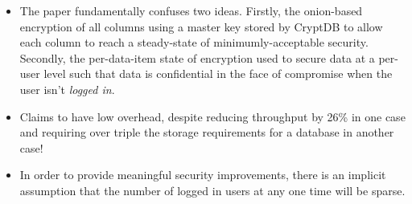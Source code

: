 \documentclass[11pt]{article}
\begin{document}
\begin{itemize}

    \item The paper fundamentally confuses two ideas. Firstly, the onion-based
    encryption of all columns using a master key stored by CryptDB to allow
    each column to reach a steady-state of minimumly-acceptable security.
    Secondly, the per-data-item state of encryption used to secure data at a
    per-user level such that data is confidential in the face of compromise
    when the user isn't \textit{logged in}.

    \item Claims to have low overhead, despite reducing throughput by 26\% in
    one case and requiring over triple the storage requirements for a database
    in another case!



    \item In order to provide meaningful security improvements, there is an
    implicit assumption that the number of logged in users at any one time will
    be sparse.







\end{itemize}
\end{document}
